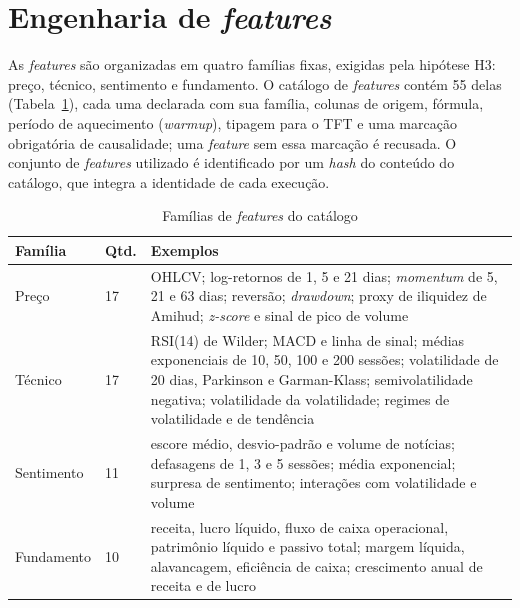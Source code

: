 \section{Engenharia de \textit{features}} \label{sec:features}
As \textit{features} são organizadas em quatro famílias fixas, exigidas pela hipótese H3: preço, técnico, sentimento e fundamento. O catálogo de \textit{features} contém 55 delas (Tabela~\ref{tab:familias}), cada uma declarada com sua família, colunas de origem, fórmula, período de aquecimento (\textit{warmup}), tipagem para o TFT e uma marcação obrigatória de causalidade; uma \textit{feature} sem essa marcação é recusada. O conjunto de \textit{features} utilizado é identificado por um \textit{hash} do conteúdo do catálogo, que integra a identidade de cada execução.

\begin{table}[htb]
\centering
\caption{Famílias de \textit{features} do catálogo}
\label{tab:familias}
\small
\begin{tabular}{p{2.3cm} p{1.2cm} p{10cm}}
\toprule
Família & Qtd. & Exemplos \\
\midrule
Preço & 17 & OHLCV; log-retornos de 1, 5 e 21 dias; \textit{momentum} de 5, 21 e 63 dias; reversão; \textit{drawdown}; proxy de iliquidez de Amihud; \textit{z-score} e sinal de pico de volume \\
Técnico & 17 & RSI(14) de Wilder; MACD e linha de sinal; médias exponenciais de 10, 50, 100 e 200 sessões; volatilidade de 20 dias, Parkinson e Garman-Klass; semivolatilidade negativa; volatilidade da volatilidade; regimes de volatilidade e de tendência \\
Sentimento & 11 & escore médio, desvio-padrão e volume de notícias; defasagens de 1, 3 e 5 sessões; média exponencial; surpresa de sentimento; interações com volatilidade e volume \\
Fundamento & 10 & receita, lucro líquido, fluxo de caixa operacional, patrimônio líquido e passivo total; margem líquida, alavancagem, eficiência de caixa; crescimento anual de receita e de lucro \\
\bottomrule
\end{tabular}
\end{table}

